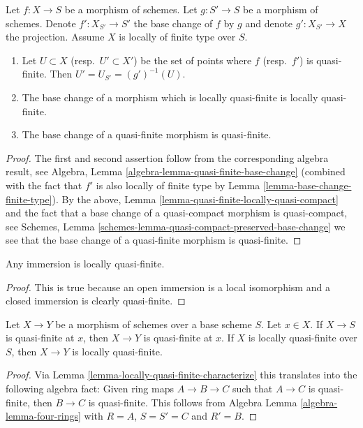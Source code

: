 \begin{lemma}
\label{lemma-base-change-quasi-finite}
Let $f : X \to S$ be a morphism of schemes.
Let $g : S' \to S$ be a morphism of schemes.
Denote $f' : X_{S'} \to S'$ the base change of $f$ by $g$
and denote $g' : X_{S'} \to X$ the projection.
Assume $X$ is locally of finite type over $S$.
\begin{enumerate}
\item Let $U \subset X$ (resp.\ $U' \subset X'$)
be the set of points where $f$ (resp.\ $f'$) is quasi-finite.
Then $U' = U_{S'} = (g')^{-1}(U)$.
\item The base change of a morphism which is locally quasi-finite
is locally quasi-finite.
\item The base change of a quasi-finite morphism is
quasi-finite.
\end{enumerate}
\end{lemma}

\begin{proof}
The first and second assertion follow from the corresponding
algebra result, see
Algebra, Lemma \ref{algebra-lemma-quasi-finite-base-change}
(combined with the fact that $f'$ is also locally of finite type by
Lemma \ref{lemma-base-change-finite-type}).
By the above, Lemma \ref{lemma-quasi-finite-locally-quasi-compact}
and the fact that a base change of a
quasi-compact morphism is quasi-compact, see
Schemes, Lemma \ref{schemes-lemma-quasi-compact-preserved-base-change}
we see that the base change of a quasi-finite morphism
is quasi-finite.
\end{proof}

\begin{lemma}
\label{lemma-immersion-locally-quasi-finite}
Any immersion is locally quasi-finite.
\end{lemma}

\begin{proof}
This is true because an open immersion is a local isomorphism
and a closed immersion is clearly quasi-finite.
\end{proof}

\begin{lemma}
\label{lemma-permanence-quasi-finite}
Let $X \to Y$ be a morphism of schemes over a base scheme $S$.
Let $x \in X$. If $X \to S$ is quasi-finite at $x$, then
$X \to Y$ is quasi-finite at $x$.
If $X$ is locally quasi-finite over $S$, then $X \to Y$
is locally quasi-finite.
\end{lemma}

\begin{proof}
Via Lemma \ref{lemma-locally-quasi-finite-characterize} this translates
into the following algebra
fact: Given ring maps $A \to B \to C$ such that $A \to C$ is
quasi-finite, then $B \to C$ is quasi-finite.
This follows from Algebra Lemma \ref{algebra-lemma-four-rings}
with $R = A$, $S = S' = C$ and $R' = B$.
\end{proof}















